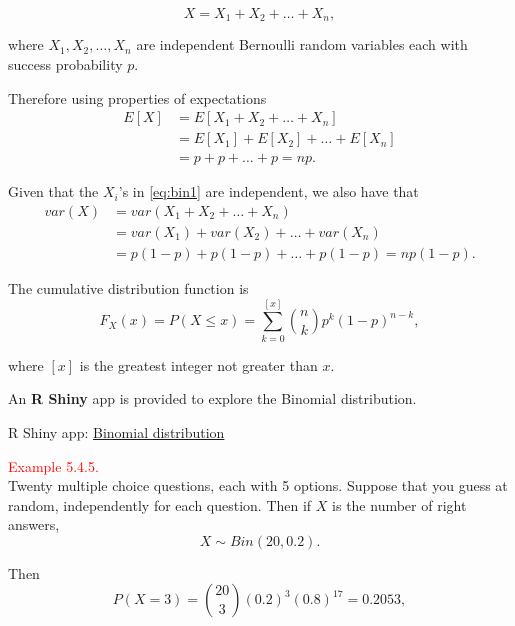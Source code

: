 \documentclass[
]{book}
\begin{document}
\begin{equation}   
X = X_1 + X_2 + \ldots + X_n, 
\label{eq:bin1}  
\end{equation}

where \(X_1, X_2, \ldots, X_n\) are independent Bernoulli random variables each with success probability \(p\).

Therefore using properties of expectations\\

\begin{align*}
E [X] & = E [ X_1 + X_2 + \ldots + X_n ] \\
&=  E [ X_1 ]+ E [X_2] + \ldots + E [X_n ]  \\
& = p + p + \ldots + p = np.\end{align*}

Given that the \(X_i\)'s in \eqref{eq:bin1} are independent, we also have that\\

\begin{align*}
var (X) & = var ( X_1 + X_2 + \ldots + X_n ) \\
&= var ( X_1) + var (X_2) + \ldots + var (X_n ) \\
& = p(1-p) + p(1-p) + \ldots + p(1-p) = np(1-p).\end{align*}

\hfill\break

The cumulative distribution function is\\

\[
F_X (x) = P (X \leq x) = \sum_{k=0}^{[x]} \binom{n}{k} p^{k}(1-p)^{n-k},
\]

where \([x]\) is the greatest integer not greater than \(x\).

An \textbf{R Shiny} app is provided to explore the Binomial distribution.

R Shiny app: \href{https://shiny-new.maths.nottingham.ac.uk/pmzpn/Binomial/}{Binomial distribution}

\hypertarget{rv:ex:mc}{}
\textcolor{red}{Example 5.4.5.}\\
Twenty multiple choice questions, each with 5 options. Suppose that you
guess at random, independently for each question. Then if \(X\) is the number of
right answers,\\

\[
X \sim Bin(20,0.2).
\]

Then\\

\[
P(X = 3) = \binom{20}{3} (0.2)^{3}(0.8)^{17} =0.2053,
\]
\end{document}
